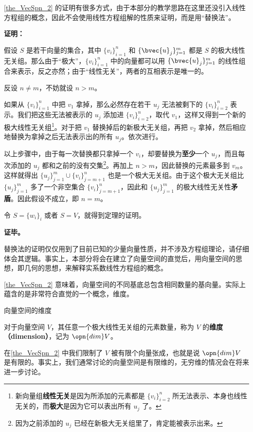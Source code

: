 \autoref{the_VecSpn_2} 的证明有很多方式，由于本部分的教学思路在这里还没引入线性方程组的概念，因此不会使用线性方程组解的性质来证明，而是用“替换法”。

\textbf{证明：}

假设 $S$ 是若干向量的集合，其中 $\{v_i\}_{i=1}^n$ 和 $\{\bvec{u}_j\}^m_{j=1}$ 都是 $S$ 的极大线性无关组。那么由于“极大”，$\{v_i\}_{i=1}^n$ 中的向量都可以用 $\{\bvec{u}_j\}^m_{j=1}$ 的线性组合来表示，反之亦然；由于“线性无关”，两者的互相表示是唯一的。

反设 $n\not=m$，不妨就设 $n>m$。

如果从 $\{v_i\}_{i=1}^n$ 中把 $v_1$ 拿掉，那么必然存在若干 $u_j$ 无法被剩下的 $\{v_i\}_{i=2}^n$ 表示。我们把这些无法被表示的 $u_j$ 添加进 $\{v_i\}_{i=2}^n$，取代 $v_1$，这样又得到一个新的极大线性无关组\footnote{新向量组\textbf{线性无关}是因为所添加的元素都是 $\{v_i\}_{i=2}^n$ 所无法表示、本身也线性无关的，而\textbf{极大}是因为它可以表出所有 $u_j$ 了。}。对于把 $v_1$ 替换掉后的新极大无关组，再把 $v_2$ 拿掉，然后相应地替换为拿掉之后无法表示出的所有 $u_j$。依次进行。

以上步骤中，由于每一次替换都只拿掉一个 $v_i$，却要替换为\textbf{至少}一个 $u_j$，而且每次添加的 $u_j$ 都和之前的没有交集\footnote{因为之前添加的 $u_j$ 已经在新极大无关组里了，肯定能被表示出来。}。再加上 $n>m$，因此替换的元素最多到 $v_m$。这样就得出 $\{u_j\}^m_{j=1} \cup \{v_i\}^n_{j=m+1}$ 也是一个极大无关组。由于这个极大无关组比 $\{u_j\}^m_{j=1}$ 多了一个非空集合 $\{v_i\}^n_{j=m+1}$，因此和 $\{u_j\}^m_{j=1}$ 的极大线性无关性\textbf{矛盾}。因此假设不成立，即 $n=m$。

令 $S=\{w_i\}_i$ 或者 $S=V$，就得到定理的证明。

\textbf{证毕。}

替换法的证明仅仅用到了目前已知的少量向量性质，并不涉及方程组理论，请仔细体会其逻辑。事实上，本部分将会在建立了向量空间的直觉后，用向量空间的思想，即几何的思想，来解释实系数线性方程组的概念。

\autoref{the_VecSpn_2} 意味着，向量空间的不同基底总包含相同数量的基向量。实际上蕴含的是非常符合直觉的一个概念，维度。

\begin{definition}{向量空间的维度}

对于向量空间 $V$，其任意一个极大线性无关组的元素数量，称为 $V$ 的\textbf{维度（dimension）}，记为 $\opn{dim}V$。

\end{definition}

在\autoref{the_VecSpn_2} 中我们限制了 $V$ 被有限个向量张成，也就是说 $\opn{dim}V$ 是有限的。事实上，我们通常讨论的向量空间是有限维的，无穷维的情况会在将来进一步讨论。

